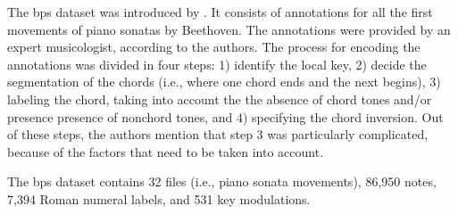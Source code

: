 

The \gls{bps} dataset was introduced by
\textcite{chen2018functional}. It consists of annotations
for all the first movements of piano sonatas by Beethoven.
The annotations were provided by an expert musicologist,
according to the authors. The process for encoding the
annotations was divided in four steps: 1) identify the local
key, 2) decide the segmentation of the chords (i.e., where
one chord ends and the next begins), 3) labeling the chord,
taking into account the the absence of chord tones and/or
presence presence of nonchord tones, and 4) specifying the
chord inversion. Out of these steps, the authors mention
that step 3 was particularly complicated, because of the
factors that need to be taken into account. 

The \gls{bps} dataset contains 32 files (i.e., piano sonata
movements), 86,950 notes, 7,394 Roman numeral labels, and
531 key modulations.